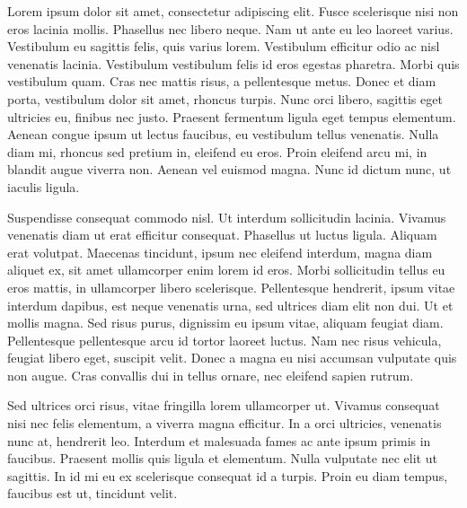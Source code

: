 \documentclass{article}
\newcommand{\voiceshrink}{-5mm}
\newenvironment{Player}
               {\begin{tcolorbox}[enhanced,
                     breakable,
                     parbox=false,
                     colback=voice-bg,
                     colframe=voice-frame,
                     add to width=\voiceshrink,
                     attach boxed title to top left={xshift=5mm,
                       yshift=-3mm,
                       yshifttext=-1mm},
                     coltitle=black,
                     colbacktitle=voice-title-bg,
                     title=Player,
                     boxed title style={size=small,
                       colframe=black}]}
               {\end{tcolorbox}}
\begin{document}
\begin{Player}

Lorem ipsum dolor sit amet, consectetur adipiscing elit. Fusce scelerisque nisi non eros lacinia mollis. Phasellus nec libero neque. Nam ut ante eu leo laoreet varius. Vestibulum eu sagittis felis, quis varius lorem. Vestibulum efficitur odio ac nisl venenatis lacinia. Vestibulum vestibulum felis id eros egestas pharetra. Morbi quis vestibulum quam. Cras nec mattis risus, a pellentesque metus. Donec et diam porta, vestibulum dolor sit amet, rhoncus turpis. Nunc orci libero, sagittis eget ultricies eu, finibus nec justo. Praesent fermentum ligula eget tempus elementum. Aenean congue ipsum ut lectus faucibus, eu vestibulum tellus venenatis. Nulla diam mi, rhoncus sed pretium in, eleifend eu eros. Proin eleifend arcu mi, in blandit augue viverra non. Aenean vel euismod magna. Nunc id dictum nunc, ut iaculis ligula.

Suspendisse consequat commodo nisl. Ut interdum sollicitudin lacinia. Vivamus venenatis diam ut erat efficitur consequat. Phasellus ut luctus ligula. Aliquam erat volutpat. Maecenas tincidunt, ipsum nec eleifend interdum, magna diam aliquet ex, sit amet ullamcorper enim lorem id eros. Morbi sollicitudin tellus eu eros mattis, in ullamcorper libero scelerisque. Pellentesque hendrerit, ipsum vitae interdum dapibus, est neque venenatis urna, sed ultrices diam elit non dui. Ut et mollis magna. Sed risus purus, dignissim eu ipsum vitae, aliquam feugiat diam. Pellentesque pellentesque arcu id tortor laoreet luctus. Nam nec risus vehicula, feugiat libero eget, suscipit velit. Donec a magna eu nisi accumsan vulputate quis non augue. Cras convallis dui in tellus ornare, nec eleifend sapien rutrum.

Sed ultrices orci risus, vitae fringilla lorem ullamcorper ut. Vivamus consequat nisi nec felis elementum, a viverra magna efficitur. In a orci ultricies, venenatis nunc at, hendrerit leo. Interdum et malesuada fames ac ante ipsum primis in faucibus. Praesent mollis quis ligula et elementum. Nulla vulputate nec elit ut sagittis. In id mi eu ex scelerisque consequat id a turpis. Proin eu diam tempus, faucibus est ut, tincidunt velit.

\end{Player}
\end{document}
